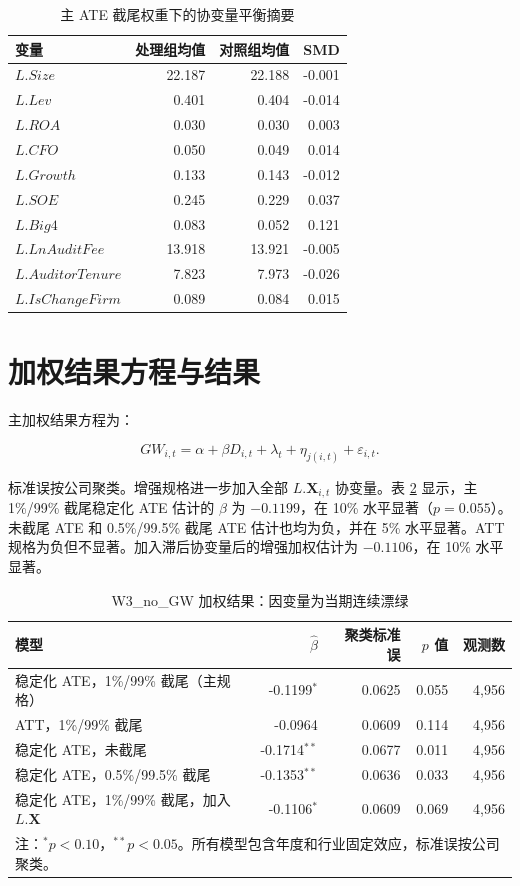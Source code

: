 \documentclass[12pt,a4paper]{article}
\begin{document}
\begin{table}[htbp]
\centering
\caption{主 ATE 截尾权重下的协变量平衡摘要}
\label{tab:balance}
\begin{tabular}{lrrr}
\toprule
变量 & 处理组均值 & 对照组均值 & SMD \\
\midrule
$L.Size$ & 22.187 & 22.188 & -0.001 \\
$L.Lev$ & 0.401 & 0.404 & -0.014 \\
$L.ROA$ & 0.030 & 0.030 & 0.003 \\
$L.CFO$ & 0.050 & 0.049 & 0.014 \\
$L.Growth$ & 0.133 & 0.143 & -0.012 \\
$L.SOE$ & 0.245 & 0.229 & 0.037 \\
$L.Big4$ & 0.083 & 0.052 & 0.121 \\
$L.LnAuditFee$ & 13.918 & 13.921 & -0.005 \\
$L.AuditorTenure$ & 7.823 & 7.973 & -0.026 \\
$L.IsChangeFirm$ & 0.089 & 0.084 & 0.015 \\
\bottomrule
\end{tabular}
\end{table}


\section{加权结果方程与结果}

主加权结果方程为：

\begin{equation}
GW_{i,t}=\alpha+\beta D_{i,t}+\lambda_t+\eta_{j(i,t)}+\varepsilon_{i,t}.
\end{equation}

标准误按公司聚类。增强规格进一步加入全部 $L.\mathbf{X}_{i,t}$ 协变量。表 \ref{tab:results} 显示，主 1\%/99\% 截尾稳定化 ATE 估计的 $\beta$ 为 $-0.1199$，在 10\% 水平显著（$p=0.055$）。未截尾 ATE 和 0.5\%/99.5\% 截尾 ATE 估计也均为负，并在 5\% 水平显著。ATT 规格为负但不显著。加入滞后协变量后的增强加权估计为 $-0.1106$，在 10\% 水平显著。

\begin{table}[htbp]
\centering
\caption{W3\_no\_GW 加权结果：因变量为当期连续漂绿}
\label{tab:results}
\begin{tabular}{lrrrr}
\toprule
模型 & $\hat{\beta}$ & 聚类标准误 & $p$ 值 & 观测数 \\
\midrule
稳定化 ATE，1\%/99\% 截尾（主规格） & -0.1199$^{*}$ & 0.0625 & 0.055 & 4,956 \\
ATT，1\%/99\% 截尾 & -0.0964 & 0.0609 & 0.114 & 4,956 \\
稳定化 ATE，未截尾 & -0.1714$^{**}$ & 0.0677 & 0.011 & 4,956 \\
稳定化 ATE，0.5\%/99.5\% 截尾 & -0.1353$^{**}$ & 0.0636 & 0.033 & 4,956 \\
稳定化 ATE，1\%/99\% 截尾，加入 $L.\mathbf{X}$ & -0.1106$^{*}$ & 0.0609 & 0.069 & 4,956 \\
\bottomrule
\multicolumn{5}{l}{\footnotesize 注：$^{*}p<0.10$，$^{**}p<0.05$。所有模型包含年度和行业固定效应，标准误按公司聚类。}
\end{tabular}
\end{table}
\end{document}
